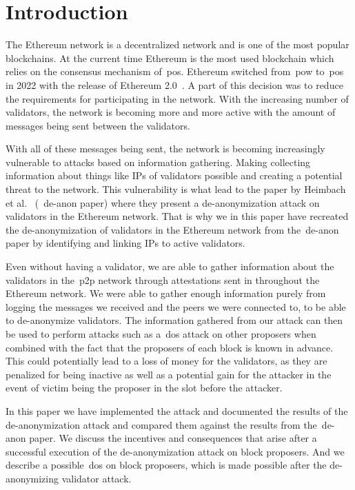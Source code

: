 

\section{Introduction}\label{sec:introduction}
The Ethereum network is a decentralized network and is one of the most popular blockchains.
At the current time Ethereum is the most used blockchain which relies on the consensus mechanism of~\gls{pos}.
Ethereum switched from~\gls{pow} to~\gls{pos} in 2022 with the release of Ethereum 2.0~\cite{EthereumProof-of-stakePoS}.
A part of this decision was to reduce the requirements for participating in the network.
With the increasing number of validators, the network is becoming more and more active with the amount of messages being sent between the validators.


With all of these messages being sent, the network is becoming increasingly vulnerable to attacks based on information gathering.
Making collecting information about things like IPs of validators possible and creating a potential threat to the network.
This vulnerability is what lead to the paper by Heimbach et al.~\cite{heimbach2024deanonymizingethereumvalidatorsp2p} (~\gls{de-anon paper}) where they present a de-anonymization attack on validators in the Ethereum network.
That is why we in this paper have recreated the de-anonymization of validators in the Ethereum network from the~\gls{de-anon paper} by identifying and linking IPs to active validators.


Even without having a validator, we are able to gather information about the validators in the~\gls{p2p} network through attestations sent in throughout the Ethereum network.
We were able to gather enough information purely from logging the messages we received and the peers we were connected to, to be able to de-anonymize validators.
The information gathered from our attack can then be used to perform attacks such as a~\gls{dos} attack on other proposers when combined with the fact that the proposers of each block is known in advance.
This could potentially lead to a loss of money for the validators, as they are penalized for being inactive as well as a potential gain for the attacker in the event of victim being the proposer in the slot before the attacker.

In this paper we have implemented the attack and documented the results of the de-anonymization attack and compared them against
the results from the~\gls{de-anon paper}.
We discuss the incentives and consequences that arise after a successful execution of the de-anonymization attack on block proposers.
And we describe a possible~\gls{dos} on block proposers, which is made possible after the de-anonymizing validator attack.


